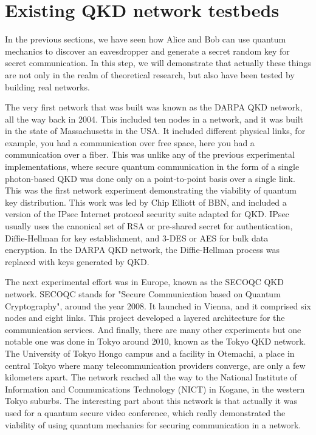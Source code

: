 \section{Existing QKD network testbeds}

In the previous sections, we have seen how Alice and Bob can use quantum mechanics to discover an eavesdropper and generate a secret random key for secret communication. In this step, we will demonstrate that actually these things are not only in the realm of theoretical research, but also have been tested by building real networks.

The very first network that was built was known as the DARPA QKD network, all the way back in 2004. This included ten nodes in a network, and it was built in the state of Massachusetts in the USA. It included different physical links, for example, you had a communication over free space, here you had a communication over a fiber. This was unlike any of the previous experimental implementations, where secure quantum communication in the form of a single photon-based QKD was done only on a point-to-point basis over a single link. This was the first network experiment demonstrating the viability of quantum key distribution.  This work was led by Chip Elliott of BBN, and included a version of the IPsec Internet protocol security suite adapted for QKD.  IPsec usually uses the canonical set of RSA or pre-shared secret for authentication, Diffie-Hellman for key establishment, and 3-DES or AES for bulk data encryption.  In the DARPA QKD network, the Diffie-Hellman process was replaced with keys generated by QKD.

The next experimental effort was in Europe, known as the SECOQC QKD network. SECOQC stands for "Secure Communication based on Quantum Cryptography", around the year 2008. It launched in Vienna, and it comprised six nodes and eight links. This project developed a layered architecture for the communication services. And finally, there are many other experiments but one notable one was done in Tokyo around 2010, known as the Tokyo QKD network. The University of Tokyo Hongo campus and a facility in Otemachi, a place in central Tokyo where many telecommunication providers converge, are only a few kilometers apart.  The network reached all the way to the National Institute of Information and Communications Technology (NICT) in Kogane, in the western Tokyo suburbs. The interesting part about this network is that actually it was used for a quantum secure video conference, which really demonstrated the viability of using quantum mechanics for securing communication in a network.

